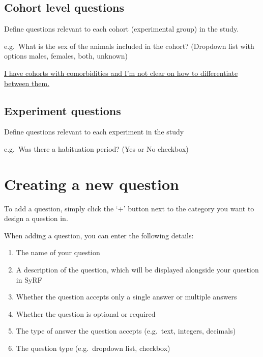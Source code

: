 \documentclass[
]{book}
\providecommand{\tightlist}{%
  \setlength{\itemsep}{0pt}\setlength{\parskip}{0pt}}
\begin{document}
\hypertarget{cohort-level-questions}{%
\subsection{Cohort level questions}\label{cohort-level-questions}}

Define questions relevant to each cohort (experimental group) in the study.

e.g.~What is the sex of the animals included in the cohort?
(Dropdown list with options males, females, both, unknown)

\href{https://syrf.org.uk/faq}{I have cohorts with comorbidities and I'm not clear on how to differentiate between them.}

\hypertarget{experiment-questions}{%
\subsection{Experiment questions}\label{experiment-questions}}

Define questions relevant to each experiment in the study

e.g.~Was there a habituation period?
(Yes or No checkbox)

\hypertarget{creating-a-new-question}{%
\section{Creating a new question}\label{creating-a-new-question}}

To add a question, simply click the `+' button next to the category you want to design a question in.

When adding a question, you can enter the following details:

\begin{enumerate}
\def\labelenumi{\arabic{enumi}.}
\tightlist
\item
  The name of your question
\item
  A description of the question, which will be displayed alongside your question in SyRF
\item
  Whether the question accepts only a single answer or multiple answers
\item
  Whether the question is optional or required
\item
  The type of answer the question accepts (e.g.~text, integers, decimals)
\item
  The question type (e.g.~dropdown list, checkbox)
\end{enumerate}
\end{document}

